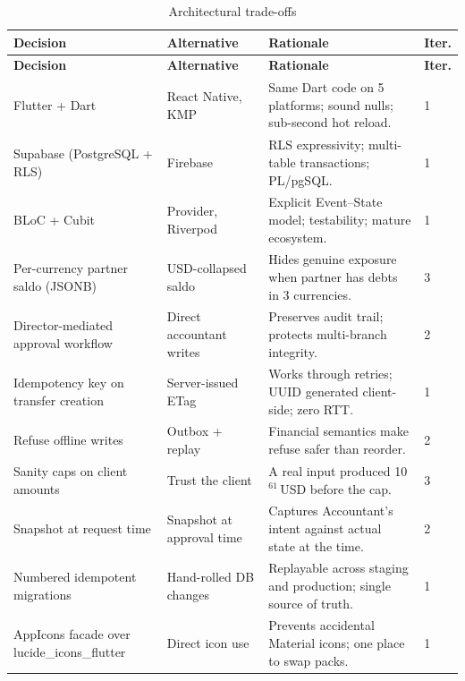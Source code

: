{\singlespacing
\begin{longtable}{p{4cm}p{4cm}p{5cm}p{0.8cm}}
  \caption{Architectural trade-offs}
  \label{tab:tradeoffs}\\
  \toprule
  \textbf{Decision}                              & \textbf{Alternative}              & \textbf{Rationale}                                                 & \textbf{Iter.}\\
  \midrule
  \endfirsthead
  \toprule
  \textbf{Decision}                              & \textbf{Alternative}              & \textbf{Rationale}                                                 & \textbf{Iter.}\\
  \midrule
  \endhead
  \bottomrule
  \endfoot
  Flutter + Dart                                 & React Native, KMP                & Same Dart code on 5 platforms; sound nulls; sub-second hot reload. & 1\\
  Supabase (PostgreSQL + RLS)                    & Firebase                         & RLS expressivity; multi-table transactions; PL/pgSQL.             & 1\\
  BLoC + Cubit                                   & Provider, Riverpod               & Explicit Event--State model; testability; mature ecosystem.        & 1\\
  Per-currency partner saldo (JSONB)             & USD-collapsed saldo              & Hides genuine exposure when partner has debts in 3 currencies.    & 3\\
  Director-mediated approval workflow            & Direct accountant writes         & Preserves audit trail; protects multi-branch integrity.           & 2\\
  Idempotency key on transfer creation           & Server-issued ETag               & Works through retries; UUID generated client-side; zero RTT.      & 1\\
  Refuse offline writes                          & Outbox + replay                  & Financial semantics make refuse safer than reorder.               & 2\\
  Sanity caps on client amounts                  & Trust the client                 & A real input produced 10$^{61}$\,USD before the cap.              & 3\\
  Snapshot at request time                       & Snapshot at approval time        & Captures Accountant's intent against actual state at the time.    & 2\\
  Numbered idempotent migrations                 & Hand-rolled DB changes           & Replayable across staging and production; single source of truth. & 1\\
  AppIcons facade over lucide\_icons\_flutter    & Direct icon use                   & Prevents accidental Material icons; one place to swap packs.     & 1\\
\end{longtable}}

